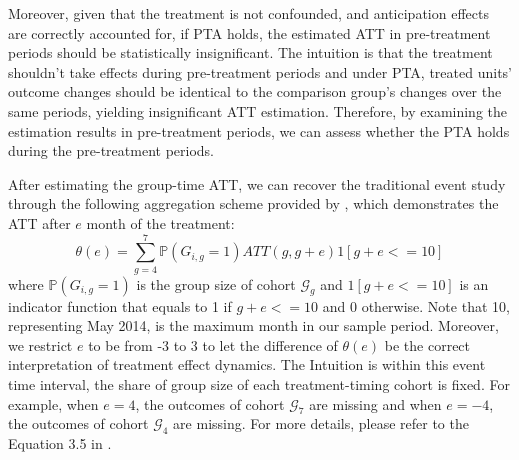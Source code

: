 Moreover, given that the treatment is not confounded, and anticipation effects are correctly accounted for, if PTA holds, the estimated ATT in pre-treatment periods should be statistically insignificant.
The intuition is that the treatment shouldn't take effects during pre-treatment periods and under PTA, treated units' outcome changes should be identical to the comparison group's changes over the same periods, yielding insignificant ATT estimation.
Therefore, by examining the estimation results in pre-treatment periods, we can assess whether the PTA holds during the pre-treatment periods.


After estimating the group-time ATT, we can recover the traditional event study through the following aggregation scheme provided by \cite{callaway2021difference}, which demonstrates the ATT after $e$ month of the treatment:
\begin{equation}\label{eq:event_aggregation}
\theta(e) = \sum_{g=4}^7 \mathbb{P}(G_{i, g} = 1) ATT(g, g+e) 1[g+e <= 10]
\end{equation}
where $\mathbb{P}(G_{i, g} = 1)$ is the group size of cohort $\mathcal{G}_g$ and $1[g+e <= 10]$ is an indicator function that equals to 1 if $g+e <= 10$ and 0 otherwise. Note that 10, representing May 2014, is the maximum month in our sample period. Moreover, we restrict $e$ to be from -3 to 3 to let the difference of $\theta(e)$ be the correct interpretation of treatment effect dynamics. The Intuition is within this event time interval, the share of group size of each treatment-timing cohort is fixed. For example, when $e=4$, the outcomes of cohort $\mathcal{G}_7$ are missing and when $e=-4$, the outcomes of cohort $\mathcal{G}_4$ are missing. For more details, please refer to the Equation 3.5 in \cite{callaway2021difference}.
